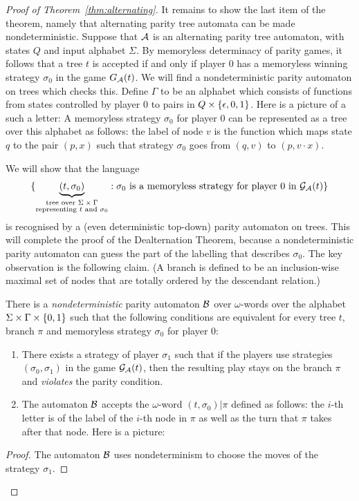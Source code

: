 \begin{proof}[Proof of Theorem~\ref{thm:alternating}]
It remains to show the last item of the theorem, namely that alternating parity tree automata can be made nondeterministic. Suppose that $\mathcal{A}$ is an alternating parity tree automaton, with states $Q$ and  input alphabet $\Sigma$. By memoryless determinacy of parity games, it follows that a tree $t$ is accepted if and only if player $0$ has a   memoryless winning strategy $\sigma_0$ in the game $G_{\mathcal{A}}(t)$. We will find a  nondeterministic  parity automaton on trees which checks this. Define 
$\Gamma$ to be an alphabet which consists of functions from states controlled by player $0$ to pairs in $Q \times \{\epsilon,0,1\}$. 
Here is a picture of a such a letter:
A memoryless strategy $\sigma_0$ for player $0$ can be represented  as a tree  over this alphabet as follows: the label of node $v$ is the function which maps state $q$ to the pair $(p,x)$ such that strategy $\sigma_0$ goes from $(q,v)$ to $(p,v \cdot x)$. 



We will show that  the  language 
	\begin{align}\label{eq:strategy-language}
  \{\underbrace{(t,\sigma_0)}_{\substack{\text{tree over $\Sigma \times \Gamma$}\\ \text{representing $t$ and $\sigma_0$}}} : \text{$\sigma_0$ is a memoryless strategy for player $0$ in $\mathcal{G}_{\mathcal{A}}(t)$}\}
\end{align}
is recognised  by a (even deterministic top-down) parity automaton on trees. This will  complete the proof of the Dealternation Theorem, because a nondeterministic parity automaton can guess the part of the  labelling that describes $\sigma_0$. The key observation is the following claim. (A branch is defined to be an inclusion-wise maximal set of nodes that are totally ordered by the descendant relation.)
\begin{claim}
There is  a \emph{nondeterministic} parity automaton  $\mathcal{B}$ over $\omega$-words over the alphabet $\Sigma \times \Gamma \times \{0,1\}$ such that the following conditions are equivalent for every tree $t$,  branch $\pi$ and memoryless strategy $\sigma_0$ for player $0$:
\begin{enumerate}
	\item There exists a strategy of player $\sigma_1$ such that if the players use strategies $(\sigma_0,\sigma_1)$ in  the game $\mathcal{G}_{\mathcal{A}}(t)$, then the resulting play  stays on the branch $\pi$ and \emph{violates} the parity condition.
	\item The automaton $\mathcal{B}$ accepts the $\omega$-word $(t,\sigma_0)|\pi$
 defined as follows: the  $i$-th letter is of the label of the $i$-th node in $\pi$ as well as the turn that $\pi$ takes after that node. Here is a picture:
\end{enumerate}	
\end{claim}
\begin{proof}The automaton $\mathcal{B}$ uses nondeterminism to choose the moves of the strategy $\sigma_1$. 
\end{proof}


\end{proof}
